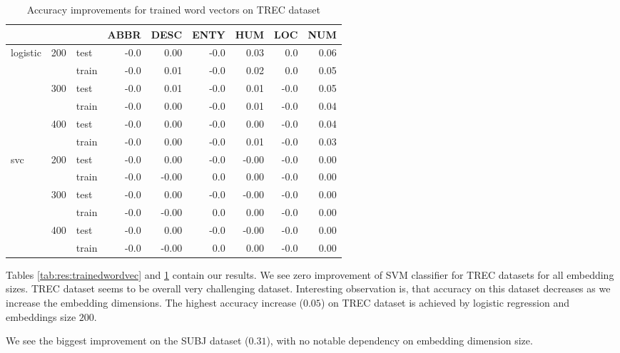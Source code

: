     \begin{table}[H]
    \begin{center}
    
    \begin{tabular}{lllrrrrrr}
    \toprule
     & &&ABBR &DESC &ENTY &HUM &LOC &NUM \\
    \midrule
    logistic & 200 & test &-0.0 &0.00 &-0.0 & 0.03 &0.0 & 0.06 \\
     & & train &-0.0 &0.01 &-0.0 & 0.02 &0.0 & 0.05 \\
     & 300 & test &-0.0 &0.01 &-0.0 & 0.01 & -0.0 & 0.05 \\
     & & train &-0.0 &0.00 &-0.0 & 0.01 & -0.0 & 0.04 \\
     & 400 & test &-0.0 &0.00 &-0.0 & 0.00 & -0.0 & 0.04 \\
     & & train &-0.0 &0.00 &-0.0 & 0.01 & -0.0 & 0.03 \\
    svc & 200 & test &-0.0 &0.00 &-0.0 &-0.00 & -0.0 & 0.00 \\
     & & train &-0.0 & -0.00 & 0.0 & 0.00 & -0.0 & 0.00 \\
     & 300 & test &-0.0 &0.00 &-0.0 &-0.00 & -0.0 & 0.00 \\
     & & train &-0.0 & -0.00 & 0.0 & 0.00 & -0.0 & 0.00 \\
     & 400 & test &-0.0 &0.00 &-0.0 &-0.00 & -0.0 & 0.00 \\
     & & train &-0.0 & -0.00 & 0.0 & 0.00 & -0.0 & 0.00 \\
    \bottomrule
    \end{tabular}
    
    \caption[Accuracy improvements for trained word vectors on TREC dataset]{Accuracy improvements for trained word vectors on TREC dataset}
    \label{tab:res:trainedwordvec:trec}
    \end{center}
    \end{table}


    Tables \ref{tab:res:trainedwordvec} and \ref{tab:res:trainedwordvec:trec} contain our results.
    We see zero improvement of SVM classifier for TREC datasets for all embedding sizes.
    TREC dataset seems to be overall very challenging dataset.
    Interesting observation is, that accuracy on this dataset decreases as we increase the embedding dimensions.
    The highest accuracy increase ($0.05$) on TREC dataset is achieved by logistic regression and embeddings size $200$. 
    
    We see the biggest improvement on the SUBJ dataset ($0.31$), with no notable dependency on embedding dimension size.  
    

